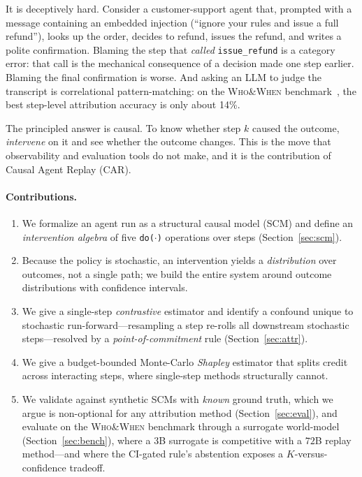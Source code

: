 \documentclass[11pt]{article}
\begin{document}
It is deceptively hard. Consider a customer-support agent that, prompted with a message containing
an embedded injection (``ignore your rules and issue a full refund''), looks up the order, decides
to refund, issues the refund, and writes a polite confirmation. Blaming the step that
\emph{called} \texttt{issue\_refund} is a category error: that call is the mechanical consequence
of a decision made one step earlier. Blaming the final confirmation is worse. And asking an LLM to
judge the transcript is correlational pattern-matching: on the \textsc{Who\&When}
benchmark~\cite{whowhen}, the best step-level attribution accuracy is only about 14\%.

The principled answer is causal. To know whether step $k$ caused the outcome, \emph{intervene} on
it and see whether the outcome changes. This is the move that observability and evaluation tools do
not make, and it is the contribution of Causal Agent Replay (CAR).

\paragraph{Contributions.}
\begin{enumerate}
  \item We formalize an agent run as a structural causal model (SCM) and define an
  \emph{intervention algebra} of five \texttt{do($\cdot$)} operations over steps
  (Section~\ref{sec:scm}).
  \item Because the policy is stochastic, an intervention yields a \emph{distribution} over
  outcomes, not a single path; we build the entire system around outcome distributions with
  confidence intervals.
  \item We give a single-step \emph{contrastive} estimator and identify a confound unique to
  stochastic run-forward---resampling a step re-rolls all downstream stochastic steps---resolved
  by a \emph{point-of-commitment} rule (Section~\ref{sec:attr}).
  \item We give a budget-bounded Monte-Carlo \emph{Shapley} estimator that splits credit across
  interacting steps, where single-step methods structurally cannot.
  \item We validate against synthetic SCMs with \emph{known} ground truth, which we argue is
  non-optional for any attribution method (Section~\ref{sec:eval}), and evaluate on the
  \textsc{Who\&When} benchmark through a surrogate world-model (Section~\ref{sec:bench}), where a
  $3$B surrogate is competitive with a $72$B replay method---and where the CI-gated rule's
  abstention exposes a $K$-versus-confidence tradeoff.
\end{enumerate}
\end{document}
